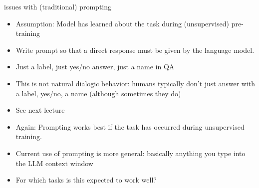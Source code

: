 \begin{frame}{issues with (traditional) prompting}

\vfill

\begin{itemize}
    \item Assumption: Model has learned about the task during (unsupervised) pre-training 
    \item Write prompt so that  a direct response must be
    given by the language model.
        \item Just a label, just yes/no answer, just a name
    in QA
    \item This is not natural dialogic behavior: humans
    typically don't
    just answer with a label, yes/no, a name (although
    sometimes they do)
    \item See next lecture
\item Again: Prompting works best if the task has occurred during
unsupervised training.
\item Current use of prompting is more general: basically
anything you type into the LLM context window
    \item \ques For which tasks is this expected to work well?

\end{itemize}

\vfill

\end{frame}

